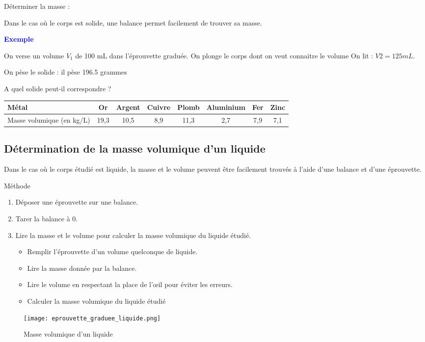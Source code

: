 \documentclass[a4paper,12pt]{article}
\begin{document}
Déterminer la masse : \par
Dans le cas où le corps est solide, une balance permet facilement de trouver sa masse.

\textbf{\textcolor{blue}{Exemple}} \par 

On verse un volume \(V_1\) de 100 mL dans l'éprouvette graduée.
On plonge le corps dont on veut connaitre le volume
On lit : \(V2 = 125 mL\).

On pèse le solide : il pèse 196.5 grammes

A quel solide peut-il correspondre ?

\begin{tabular}{|l|c|c|c|c|c|c|c|}
  \hline
  Métal & Or & Argent & Cuivre & Plomb & Aluminium & Fer & Zinc \\
  \hline
  Masse volumique (en kg/L) & 19,3 & 10,5 & 8,9 & 11,3 & 2,7 & 7,9 & 7,1 \\
  \hline
  \end{tabular}


\subsection*{Détermination de la masse volumique d'un liquide}

Dans le cas où le corps étudié est liquide, la masse et le volume peuvent être facilement trouvés à l'aide d'une balance et d'une éprouvette.

Méthode

\begin{enumerate}[noitemsep]
  \item Déposer une éprouvette sur une balance.
  \item Tarer la balance à 0.
  \item Lire la masse et le volume pour calculer la masse volumique du liquide étudié.
  \begin{itemize}
    \item Remplir l'éprouvette d'un volume quelconque de liquide.
    \item Lire la masse donnée par la balance.
    \item Lire le volume en respectant la place de l’œil pour éviter les erreurs. 
    \item Calculer la masse volumique du liquide étudié
  \end{itemize}
\end{enumerate}

\begin{figure}[H]
  \centering
  \texttt{[image: eprouvette\_graduee\_liquide.png]}
  \caption{\label{} Masse  volumique d'un liquide}
\end{figure}
\end{document}
